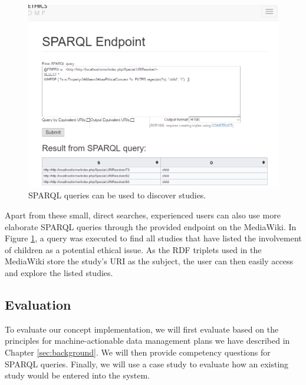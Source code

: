 \documentclass[10pt]{article}
\begin{document}
\begin{figure}[H]
\centering
	\includegraphics[width=1\textwidth]{img/sparql.png}
	\caption{SPARQL queries can be used to discover studies.}
	\label{fig:sparqlwiki}
\end{figure}

Apart from these small, direct searches, experienced users can also use more elaborate SPARQL queries through the provided endpoint on the MediaWiki. In Figure \ref{fig:sparqlwiki}, a query was executed to find all studies that have listed the involvement of children as a potential ethical issue. As the RDF triplets used in the MediaWiki store the study's URI as the subject, the user can then easily access and explore the listed studies.

\subsection{Evaluation}
To evaluate our concept implementation, we will first evaluate based on the principles for machine-actionable data management plans we have described in Chapter \ref{sec:background}. We will then provide competency questions for SPARQL queries. Finally, we will use a case study to evaluate how an existing study would be entered into the system.
\end{document}
